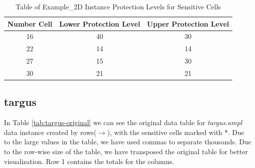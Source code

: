 \documentclass[11pt,a4paper]{article}
\begin{document}
\begin{table}[h]
    \centering
    \begin{tabular}{c | c | c}
        \textbf{Number Cell} & \textbf{Lower Protection Level} & \textbf{Upper Protection Level} \\
        \toprule
        16	&	40	&	30 \\
	      22	&	14	&	14 \\
	      27	&	15	&	30 \\
	      30	&	21	&	21
    \end{tabular}
    \caption{Table of Example\_2D Instance Protection Levels for Sensitive Cells}
    \label{tab:example2D-protection-levels}
\end{table}


\subsection{targus}
In Table \ref{tab:targus-original} we can see the original data table for \textit{targus.ampl} data instance created by rows($\rightarrow$), with the sensitive cells marked with *. 
Due to the large values in the table, we have used commas to separate thousands.
Due to the row-wise size of the table, we have transposed the original table for better visualization.
Row 1 contains the totals for the columns.
\end{document}
